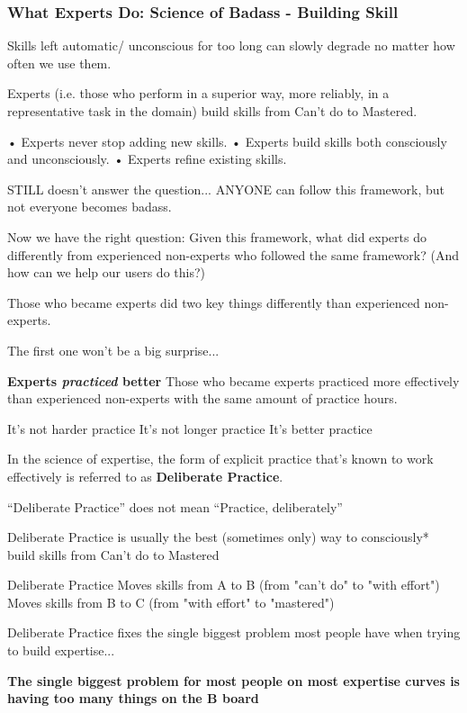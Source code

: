 \subsubsection{What Experts Do: Science of Badass -  Building Skill}

Skills left automatic/ unconscious for too long can slowly degrade no matter how often we use them.

Experts (i.e. those who perform in a superior way, more reliably, in a representative task in the domain) build skills from Can’t do to Mastered.

• Experts never stop adding new skills.
• Experts build skills both consciously and unconsciously.
• Experts refine existing skills.

STILL doesn’t answer the question... ANYONE can follow this framework, but not everyone becomes badass.

Now we have the right question:
Given this framework, what did experts do differently from experienced non-experts who followed the same framework? (And how can we help our users do this?)

Those who became experts did two key things differently than experienced non-experts.

The first one won’t be a big surprise...

\textbf{Experts \textit{practiced} better}
Those who became experts practiced more effectively than experienced non-experts with the same amount of practice hours.

It’s not harder practice It’s not longer practice It’s better practice

In the science of expertise, the form of explicit practice that’s
known to work effectively is referred to as  \textbf{Deliberate Practice}.

“Deliberate Practice” does not mean “Practice, deliberately”

Deliberate Practice is usually the best (sometimes only) way to consciously* build skills from Can’t do to Mastered

Deliberate Practice Moves skills from A to B (from "can’t do" to "with effort") Moves skills from B to C (from "with effort" to "mastered")

Deliberate Practice fixes the single biggest problem most people have when trying to build expertise...

\textbf{The single biggest problem for most people on most expertise curves is having too many things on the B board}

